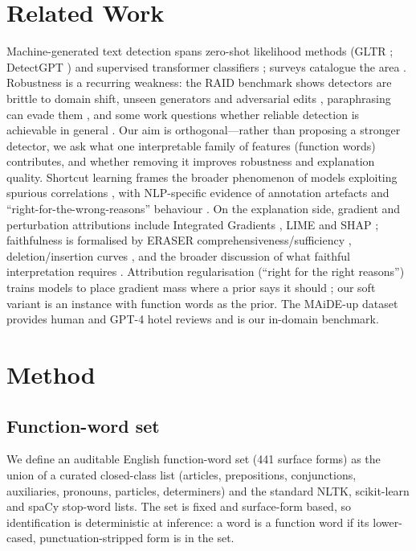 \documentclass[11pt]{article}
\begin{document}
\section{Related Work}
Machine-generated text detection spans zero-shot likelihood methods (GLTR \cite{gltr}; DetectGPT \cite{detectgpt}) and supervised transformer classifiers \cite{roberta,solaiman}; surveys catalogue the area \cite{crothers}. Robustness is a recurring weakness: the RAID benchmark shows detectors are brittle to domain shift, unseen generators and adversarial edits \cite{raid}, paraphrasing can evade them \cite{krishna}, and some work questions whether reliable detection is achievable in general \cite{sadasivan}. Our aim is orthogonal---rather than proposing a stronger detector, we ask what one interpretable family of features (function words) contributes, and whether removing it improves robustness and explanation quality. Shortcut learning frames the broader phenomenon of models exploiting spurious correlations \cite{geirhos}, with NLP-specific evidence of annotation artefacts and ``right-for-the-wrong-reasons'' behaviour \cite{gururangan,mccoy}. On the explanation side, gradient and perturbation attributions include Integrated Gradients \cite{ig}, LIME \cite{lime} and SHAP \cite{shap}; faithfulness is formalised by ERASER comprehensiveness/sufficiency \cite{eraser}, deletion/insertion curves \cite{rise}, and the broader discussion of what faithful interpretation requires \cite{jacovi}. Attribution regularisation (``right for the right reasons'') trains models to place gradient mass where a prior says it should \cite{ross}; our soft variant is an instance with function words as the prior. The MAiDE-up dataset \cite{maideup} provides human and GPT-4 hotel reviews and is our in-domain benchmark.
\section{Method}
\subsection{Function-word set}
We define an auditable English function-word set (441 surface forms) as the union of a curated closed-class list (articles, prepositions, conjunctions, auxiliaries, pronouns, particles, determiners) and the standard NLTK, scikit-learn and spaCy \cite{spacy} stop-word lists. The set is fixed and surface-form based, so identification is deterministic at inference: a word is a function word if its lower-cased, punctuation-stripped form is in the set.
\end{document}
